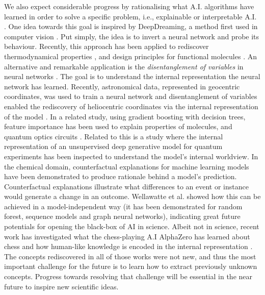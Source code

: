  We also expect considerable progress by rationalising what A.I. algorithms have learned in order to solve a specific problem, i.e., explainable or interpretable A.I. \cite{montavon2018methods,samek2019explainable,roscher2020explainable,lundberg2020local}. One idea towards this goal is inspired by DeepDreaming, a method first used in computer vision \cite{mahendran2015understanding,mordvintsev2015inceptionism}. Put simply, the idea is to invert a neural network and probe its behaviour. Recently, this approach has been applied to rediscover thermodynamical properties \cite{seif2020machine}, and design principles for functional molecules \cite{shen2020deep}. An alternative and remarkable application is the \textit{disentanglement of variables} in neural networks \cite{burgess2018understanding}. The goal is to understand the internal representation the neural network has learned. Recently, astronomical data, represented in geocentric coordinates, was used to train a neural network and disentanglement of variables enabled the rediscovery of heliocentric coordinates via the internal representation of the model \cite{iten2020discovering}. In a related study, using gradient boosting with decision trees, feature importance has been used to explain properties of molecules, and quantum optics circuits \cite{friederich2021scientific}. Related to this is a study where the internal representation of an unsupervised deep generative model for quantum experiments has been inspected to understand the model's internal worldview\cite{flam2021learning}. In the chemical domain, counterfactual explanations for machine learning models have been demonstrated to produce rationale behind a model's prediction. Counterfactual explanations illustrate what differences to an event or instance would generate a change in an outcome. Wellawatte et al. \cite{wellawatte2022model} showed how this can be achieved in a model-independent way (it has been demonstrated for random forest, sequence models and graph neural networks), indicating great future potentials for opening the black-box of AI in science. Albeit not in science, recent work has investigated what the chess-playing A.I AlphaZero has learned about chess and how human-like knowledge is encoded in the internal representation \cite{mcgrath2021acquisition}. The concepts rediscovered in all of those works were not new, and thus the most important challenge for the future is to learn how to extract previously unknown concepts. Progress towards resolving that challenge will be essential in the near future to inspire new scientific ideas. 


